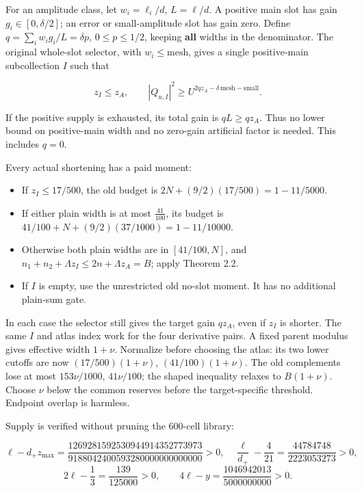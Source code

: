 \documentclass[11pt,a4paper]{article}
\providecommand{\tightlist}{\setlength{\itemsep}{0pt}\setlength{\parskip}{0pt}}
\begin{document}
For an amplitude class, let \(w_i=\ell_i/d\), \(L=\ell/d\). A positive
main slot has gain \(g_i\in[0,\delta/2]\); an error or small-amplitude
slot has gain zero. Define \(q=\sum_iw_i g_i/L=\delta p\),
\(0\le p\le1/2\), keeping \textbf{all} widths in the denominator. The
original whole-slot selector, with \(w_i\le\text{mesh}\), gives a single
positive-main subcollection \(I\) such that

\[
z_I\le z_A,\qquad
|Q_{u,I}|^2\ge U^{2qz_A-\delta\,\text{mesh}-\text{small}}.
\tag{3.4}
\]

If the positive supply is exhausted, its total gain is \(qL\ge qz_A\).
Thus no lower bound on positive-main width and no zero-gain artificial
factor is needed. This includes \(q=0\).

Every actual shortening has a paid moment:

\begin{itemize}
\tightlist
\item
  If \(z_I\le17/500\), the old budget is \(2N+(9/2)(17/500)=1-11/5000\).
\item
  If either plain width is at most \(\frac{41}{100}\), its budget is
  \(41/100+N+(9/2)(37/1000)=1-11/10000\).
\item
  Otherwise both plain widths are in \([41/100,N]\), and
  \(n_1+n_2+\Lambda z_I\le2n+\Lambda z_A=B\); apply Theorem 2.2.
\item
  If \(I\) is empty, use the unrestricted old no-slot moment. It has no
  additional plain-sum gate.
\end{itemize}

In each case the selector still gives the target gain \(qz_A\), even if
\(z_I\) is shorter. The same \(I\) and atlas index work for the four
derivative pairs. A fixed parent modulus gives effective width
\(1+\nu\). Normalize before choosing the atlas: its two lower cutoffs
are now \((17/500)(1+\nu)\), \((41/100)(1+\nu)\). The old complements
lose at most \(153\nu/1000\), \(41\nu/100\); the shaped inequality
relaxes to \(B(1+\nu)\). Choose \(\nu\) below the common reserves before
the target-specific threshold. Endpoint overlap is harmless.

Supply is verified without pruning the 600-cell library:

\[
\ell-d_+z_{\max}
 =\frac{1269281592530944914352773973}{9188042400593280000000000000}>0,
\quad
\frac{\ell}{d_+}-\frac4{21}
 =\frac{44784748}{2223053273}>0,
\] \[
2\ell-\frac13=\frac{139}{125000}>0,\qquad
4\ell-y=\frac{1046942013}{5000000000}>0.
\tag{3.5}
\]
\end{document}
